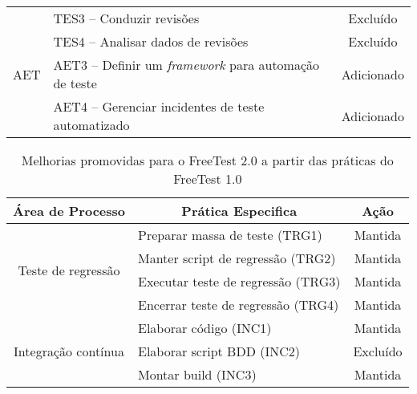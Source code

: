 \begin{table}[!ht]
{\begin{tabular}{|l|l|l|}
    \cline{2-3}
    \multicolumn{1}{|c|}{} & TES3 – Conduzir revisões & \multicolumn{1}{c|}{Excluído} \\ 
    \cline{2-3}
    \multicolumn{1}{|c|}{} & TES4 – Analisar dados de revisões & \multicolumn{1}{c|}{Excluído} \\ 
    \hline
    \multicolumn{1}{|c|}{AET} & AET3 – Definir um \textit{framework} para automação de teste & \multicolumn{1}{c|}{Adicionado} \\ 
    \cline{2-3}
    \multicolumn{1}{|c|}{} & AET4 – Gerenciar incidentes de teste automatizado & \multicolumn{1}{c|}{Adicionado} \\ 
    \hline
    \end{tabular}
}
\end{table}


\begin{table}[H]
\centering
\caption{Melhorias promovidas para o FreeTest 2.0 a partir das práticas do FreeTest 1.0}
\label{tab:4.4}
\begin{tabular}{|c|l|c|}
\hline
\textbf{Área de Processo}                                 & \multicolumn{1}{c|}{\textbf{Prática Especifica}} & \textbf{Ação}                 \\ \hline
\multirow{4}{*}{Teste de regressão}                       & Preparar massa de teste (TRG1)                   & Mantida                       \\ \cline{2-3} 
                                                          & Manter script de regressão (TRG2)                & Mantida                       \\ \cline{2-3} 
                                                          & Executar teste de regressão (TRG3)               & Mantida                       \\ \cline{2-3} 
                                                          & Encerrar teste de regressão (TRG4)               & Mantida                       \\ \hline
\multirow{3}{*}{Integração contínua}                      & Elaborar código (INC1)                           & Mantida                       \\ \cline{2-3} 
                                                          & Elaborar script BDD (INC2)                       & Excluído                      \\ \cline{2-3} 
                                                          & Montar build (INC3)                              & Mantida                       \\ \hline

\end{tabular}
\end{table}

